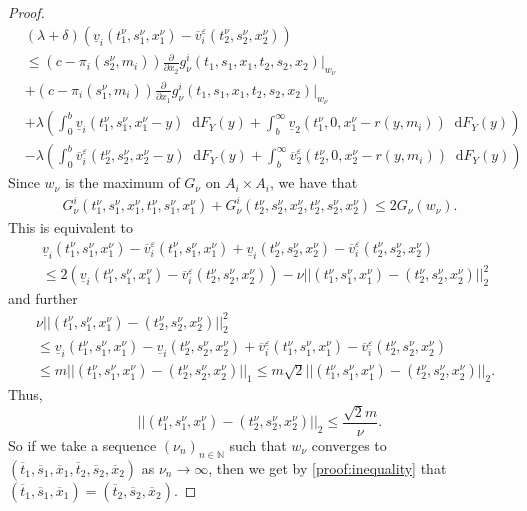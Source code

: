 \documentclass[a4paper]{scrartcl}
\theoremstyle{remark}
\theoremstyle{definition}
\numberwithin{equation}{section}
\newcommand*\diff{\mathop{}\!\mathrm{d}}
\begin{document}
\begin{proof}
    \begin{align}
    \label{proof:(delta+lambda)}
         &(\lambda + \delta)(\underline{v}_i(t_1^\nu,s_1^\nu,x_1^\nu)-\overline{v}^\varepsilon_i(t_2^\nu,s_2^\nu,x_2^\nu)) \nonumber\\
        &\leq \left(c-\pi_i(s_2^\nu,m_i)\right)\frac{\partial}{\partial x_2}g_{\nu}^i(t_1,s_1,x_1,t_2,s_2,x_2)|_{w_{\nu}} \nonumber \\&+ \left(c-\pi_i(s_1^\nu,m_i)\right)\frac{\partial}{\partial x_1}g_{\nu}^i(t_1,s_1,x_1,t_2,s_2,x_2)|_{w_{\nu}}\nonumber\\
        &+\lambda \left(\int_{0}^{b}\underline{v}_i(t_1^\nu,s_1^\nu,x_1^\nu-y)\diff F_Y(y)  
   +\int_{b}^{\infty}\underline{v}_2(t_1^\nu,0,x_1^\nu-r(y,m_i))\diff F_Y(y)\right) \nonumber\\
   &-  \lambda \left(\int_{0}^{b}\overline{v}^\varepsilon_i(t_2^\nu,s_2^\nu,x_2^\nu-y)\diff F_Y(y)  
    +\int_{b}^{\infty}\overline{v}^\varepsilon_2(t_2^\nu,0,x_2^\nu-r(y,m_i))\diff F_Y(y)\right)
    \end{align}
    Since $w_\nu$ is the maximum of $G_\nu$ on $A_i \times A_i$,  we have that 
    \begin{align*}
        G_\nu ^i (t_1^\nu,s_1^\nu,x_1^\nu,t_1^\nu,s_1^\nu,x_1^\nu)+G_\nu ^i (t_2^\nu,s_2^\nu,x_2^\nu,t_2^\nu,s_2^\nu,x_2^\nu) \leq 2G_\nu(w_\nu).
    \end{align*}
    This is equivalent to
    \begin{align*}
        &\underline{v}_i(t_1^\nu,s_1^\nu,x_1^\nu)-\overline{v}_i^\varepsilon(t_1^\nu,s_1^\nu,x_1^\nu)+ \underline{v}_i(t_2^\nu,s_2^\nu,x_2^\nu)-\overline{v}_i^\varepsilon(t_2^\nu,s_2^\nu,x_2^\nu) \\
        &\leq 2(\underline{v}_i(t_1^\nu,s_1^\nu,x_1^\nu)-\overline{v}_i^\varepsilon(t_2^\nu,s_2^\nu,x_2^\nu)) - \nu ||(t_1^\nu,s_1^\nu,x_1^\nu)-(t_2^\nu,s_2^\nu,x_2^\nu)||^2_2
    \end{align*}
    and further 
    \begin{align*}
       &\nu||(t_1^\nu,s_1^\nu,x_1^\nu)-(t_2^\nu,s_2^\nu,x_2^\nu)||^2_2 \\
       &\leq \underline{v}_i(t_1^\nu,s_1^\nu,x_1^\nu)- \underline{v}_i(t_2^\nu,s_2^\nu,x_2^\nu)+ \overline{v}_i^\varepsilon(t_1^\nu,s_1^\nu,x_1^\nu)-\overline{v}_i^\varepsilon(t_2^\nu,s_2^\nu,x_2^\nu)\\
       & \leq m ||(t_1^\nu,s_1^\nu,x_1^\nu)-(t_2^\nu,s_2^\nu,x_2^\nu)||_1
       \leq m \sqrt{2} ||(t_1^\nu,s_1^\nu,x_1^\nu)-(t_2^\nu,s_2^\nu,x_2^\nu)||_2.
    \end{align*}
    Thus,
    \begin{equation}
    \label{proof:inequality}
        ||(t_1^\nu,s_1^\nu,x_1^\nu)-(t_2^\nu,s_2^\nu,x_2^\nu)||_2 \leq \frac{\sqrt{2}m}{\nu}.
    \end{equation}
    So if we take a sequence $(\nu_n)_{n \in \mathbb{N}}$ such that $w_\nu$ converges to $(\overline{t}_1,\overline{s}_1,\overline{x}_1,\overline{t}_2,\overline{s}_2,\overline{x}_2)$ as $\nu_n \rightarrow \infty$, then we get by \eqref{proof:inequality} that $(\overline{t}_1,\overline{s}_1,\overline{x}_1)=(\overline{t}_2,\overline{s}_2,\overline{x}_2)$.


\end{proof}
\end{document}
